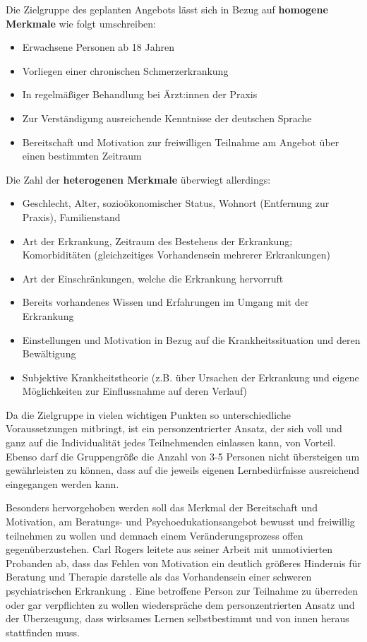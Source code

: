 \documentclass[
  twoside,
  parskip=half-,
]{scrreprt}
\begin{document}
\begin{praxis}
  Die Zielgruppe des geplanten Angebots lässt sich in Bezug auf \textbf{homogene Merkmale} wie folgt umschreiben: 
  \begin{itemize}[itemsep=0pt]
    \item Erwachsene Personen ab 18 Jahren
    \item Vorliegen einer chronischen Schmerzerkrankung
    \item In regelmäßiger Behandlung bei Ärzt:innen der Praxis
    \item Zur Verständigung ausreichende Kenntnisse der deutschen Sprache
    \item Bereitschaft und Motivation zur freiwilligen Teilnahme am Angebot über einen bestimmten Zeitraum
  \end{itemize}

Die Zahl der \textbf{heterogenen Merkmale} überwiegt allerdings:
\begin{itemize}[itemsep=0pt]
  \item Geschlecht, Alter, sozioökonomischer Status, Wohnort (Entfernung zur Praxis), Familienstand
  \item Art der Erkrankung, Zeitraum des Bestehens der Erkrankung; Komorbiditäten (gleichzeitiges Vorhandensein mehrerer Erkrankungen)
  \item Art der Einschränkungen, welche die Erkrankung hervorruft
  \item Bereits vorhandenes Wissen und Erfahrungen im Umgang mit der Erkrankung
  \item Einstellungen und Motivation in Bezug auf die Krankheitssituation und deren Bewältigung
  \item Subjektive Krankheitstheorie (z.B. über Ursachen der Erkrankung und eigene Möglichkeiten zur Einflussnahme auf deren Verlauf)
\end{itemize}

Da die Zielgruppe in vielen wichtigen Punkten so unterschiedliche Voraussetzungen mitbringt, ist ein personzentrierter Ansatz, der sich voll und ganz auf die Individualität jedes Teilnehmenden einlassen kann, von Vorteil. Ebenso darf die Gruppengröße die Anzahl von 3-5 Personen nicht übersteigen um gewährleisten zu können, dass auf die jeweils eigenen Lernbedürfnisse ausreichend eingegangen werden kann.

Besonders hervorgehoben werden soll das Merkmal der Bereitschaft und Motivation, am Beratungs- und Psychoedukationsangebot bewusst und freiwillig teilnehmen zu wollen und demnach einem Veränderungsprozess offen gegenüberzustehen. Carl Rogers leitete aus seiner Arbeit mit unmotivierten Probanden ab, dass das Fehlen von Motivation ein deutlich größeres Hindernis für Beratung und Therapie darstelle als das Vorhandensein einer schweren psychiatrischen Erkrankung \autocite[vgl.][195f.]{rogers1977}. Eine betroffene Person zur Teilnahme zu überreden oder gar verpflichten zu wollen wiederspräche dem personzentrierten Ansatz und der Überzeugung, dass wirksames Lernen selbstbestimmt und von innen heraus stattfinden muss. 
\end{praxis}
\end{document}

